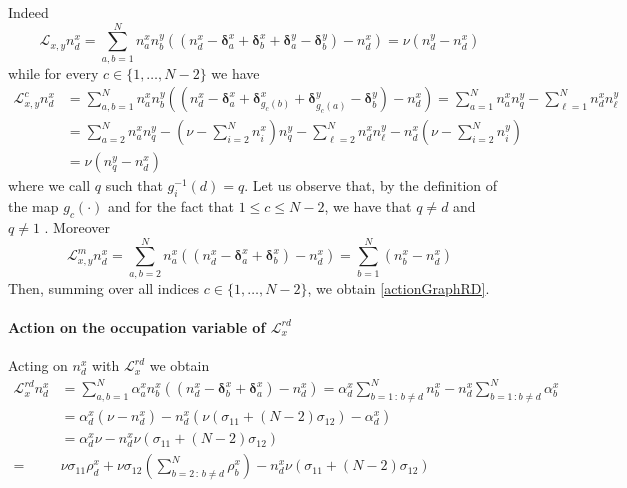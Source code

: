 \documentclass[10pt]{article}
\numberwithin{equation}{section}
\numberwithin{equation}{subsection}
\begin{document}
Indeed
\begin{equation}
	\mathcal{L}_{x,y}n_{d}^{x}=\sum_{a,b=1}^{N}n_{a}^{x}n_{b}^{y}\left((n_{d}^{x}-\bm{\delta}_{a}^{x}+\bm{\delta}_{b}^{x}+\bm{\delta}_{a}^{y}-\bm{\delta}_{b}^{y})-n_{d}^{x}\right)=\nu\left(n_{d}^{y}-n_{d}^{x}\right)
\end{equation}
while for every $c\in \{1,\ldots,N-2\}$ we have 
\begin{equation}
	\begin{split}
		\mathcal{L}_{x,y}^{c}n_{d}^{x}&=\sum_{a,b=1}^{N}n_{a}^{x}n_{b}^{y}\left((n_{d}^{x}-\bm{\delta}_{a}^{x}+\bm{\delta}_{g_{c}(b)}^{x}+\bm{\delta}_{g_{c}(a)}^{y}-\bm{\delta}_{b}^{y})-n_{d}^{x}\right)=\sum_{a=1}^{N}n_{a}^{x}n_{q}^{y}-\sum_{\ell=1}^{N}n_{d}^{x}n_{\ell}^{y}
		\\&=
		\sum_{a=2}^{N}n_{a}^{x}n_{q}^{y}-\left(\nu-\sum_{i=2}^{N}n_{i}^{x}\right)n_{q}^{y}-\sum_{\ell=2}^{N}n_{d}^{x}n_{\ell}^{y}-n_{d}^{x}\left(\nu-\sum_{i=2}^{N}n_{i}^{y}\right)
		\\&=
		\nu(n_{q}^{y}-n_{d}^{x})
	\end{split}
\end{equation}
where we call $q$ such that $g_{i}^{-1}(d)=q$. Let us observe that, by the definition of the map $g_{c}(\cdot)$ and for the fact that $1\leq c\leq N-2$, we have that $q\neq d$ and $q\neq 1$ .
Moreover
\begin{equation}
	\mathcal{L}_{x,y}^{m}n_{d}^{x}=\sum_{a,b=2}^{N}n_{a}^{x}\left((n_{d}^{x}-\bm{\delta}_{a}^{x}+\bm{\delta}_{b}^{x})-n_{d}^{x}\right)=\sum_{b=1}^{N}(n_{b}^{x}-n_{d}^{x})
\end{equation}
Then, summing over all indices $c\in\{1,\ldots,N-2\}$, we obtain \eqref{actionGraphRD}.
\paragraph{Action on the occupation variable of $\mathcal{L}_{x}^{rd}$}
Acting on $n_{d}^{x}$  with $\mathcal{L}_{x}^{rd}$ we obtain
\begin{equation}\label{actionBoudaryRD}
	\begin{split}
		\mathcal{L}_{x}^{rd}n_{d}^{x}&=\sum_{a,b=1}^{N}\alpha_{a}^{x}n_{b}^{x}\left((n_{d}^{x}-\bm{\delta}_{b}^{x}+\bm{\delta}_{a}^{x})-n_{d}^{x}\right)=\alpha_{d}^{x}\sum_{b=1\,:\,b\neq d}^{N}n_{b}^{x}-n_{d}^{x}\sum_{b=1\,:b\neq d}^{N}\alpha_{b}^{x}
		\\&=
		\alpha_{d}^{x}\left(\nu-n_{d}^{x}\right)-n_{d}^{x}\left(\nu(\sigma_{11}+(N-2)\sigma_{12})-\alpha_{d}^{x}\right)
		\\&=\alpha_{d}^{x}\nu-n_{d}^{x}\nu(\sigma_{11}+(N-2)\sigma_{12})
		\\=&
		\nu\sigma_{11}\rho_{d}^{x}+\nu\sigma_{12}\left(\sum_{b=2\,:\,b\neq d}^{N}\rho_{b}^{x}\right)-n_{d}^{x}\nu(\sigma_{11}+(N-2)\sigma_{12})
	\end{split}
\end{equation}
\end{document}
